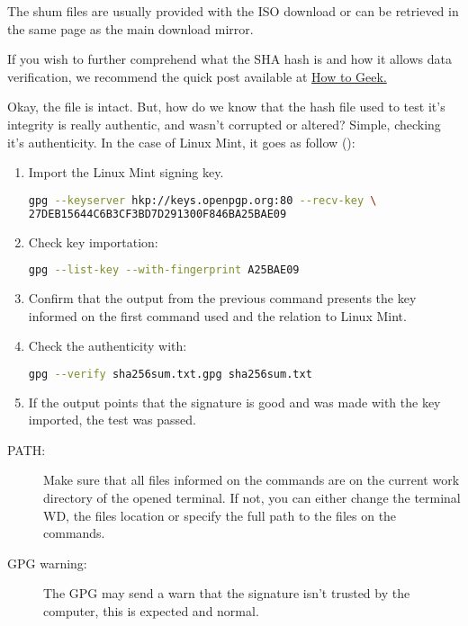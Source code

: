 \documentclass[a4paper,11pt]{article}
\begin{document}
\begin{remarkbox}
    The shum files are usually provided with the ISO download or can be
    retrieved in the same page as the main download mirror.\par
    If you wish to further comprehend what the SHA hash is and how it allows
    data verification, we recommend the quick post available at
    \href{https://www.howtogeek.com/67241/htg-explains-what-are-md5-sha-1-hashes-and-how-do-i-check-them/}{How
    to Geek.}
   
\end{remarkbox}
Okay, the file is intact. But, how do we know that the hash file used to test
it's integrity is really authentic, and wasn't corrupted or altered? Simple,
checking it's authenticity. In the case of Linux Mint, it goes as follow
(\cite{mintInstallationGuide2024}):
\begin{enumerate}
    \item Import the Linux Mint signing key.
        \begin{lstlisting}[language=bash]
gpg --keyserver hkp://keys.openpgp.org:80 --recv-key \
27DEB15644C6B3CF3BD7D291300F846BA25BAE09    
\end{lstlisting}
    \item Check key importation:
\begin{lstlisting}[language=bash]
gpg --list-key --with-fingerprint A25BAE09\end{lstlisting}
    \item Confirm that the output from the previous command presents the key
        informed on the first command used and the relation to Linux Mint.
    \item Check the authenticity with:
\begin{lstlisting}[language=bash]
gpg --verify sha256sum.txt.gpg sha256sum.txt
\end{lstlisting}
    \item If the output points that the signature is good and was made with the
        key imported, the test was passed.
\end{enumerate}
\begin{tipbox}
\begin{description}
\item[PATH:] Make sure that all files informed on the commands are on the
    current work directory of the opened terminal. If not, you can either change
    the terminal WD, the files location or specify the full path to the files on
    the commands.
\item[GPG warning:] The GPG may send a warn that the signature isn't trusted by
    the computer, this is expected and normal. 
\end{description}
\end{tipbox}
\end{document}

